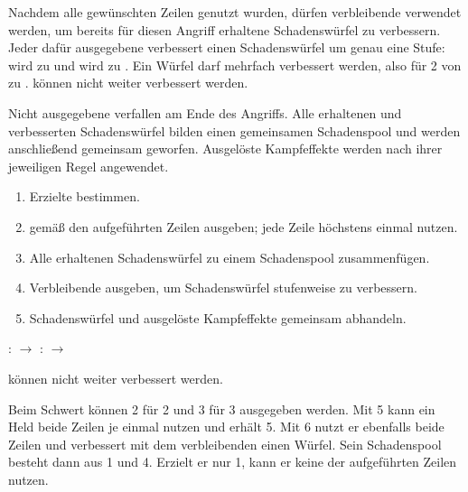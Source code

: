 Nachdem alle gewünschten Zeilen genutzt wurden, dürfen verbleibende \star{} verwendet werden, um bereits für diesen Angriff erhaltene Schadenswürfel zu verbessern. Jeder dafür ausgegebene \star{} verbessert einen Schadenswürfel um genau eine Stufe: \orangeDmgDie{} wird zu \redDmgDie{} und \redDmgDie{} wird zu \blackDmgDie{}. Ein Würfel darf mehrfach verbessert werden, also für 2\star{} von \orangeDmgDie{} zu \blackDmgDie{}. \blackDmgDie{} können nicht weiter verbessert werden.

Nicht ausgegebene \star{} verfallen am Ende des Angriffs. Alle erhaltenen und verbesserten Schadenswürfel bilden einen gemeinsamen Schadenspool und werden anschließend gemeinsam geworfen. Ausgelöste Kampfeffekte werden nach ihrer jeweiligen Regel angewendet.

\begin{kurzregel}[title=Sterne ausgeben]
\begin{enumerate}
  \item Erzielte \star{} bestimmen.
  \item \star{} gemäß den aufgeführten Zeilen ausgeben; jede Zeile höchstens einmal nutzen.
  \item Alle erhaltenen Schadenswürfel zu einem Schadenspool zusammenfügen.
  \item Verbleibende \star{} ausgeben, um Schadenswürfel stufenweise zu verbessern.
  \item Schadenswürfel und ausgelöste Kampfeffekte gemeinsam abhandeln.
\end{enumerate}
\end{kurzregel}

\begin{kurzregel}[title=Schadenswürfel verbessern]
\star{}: \orangeDmgDie{} $\rightarrow$ \redDmgDie{} \qquad
\star{}: \redDmgDie{} $\rightarrow$ \blackDmgDie{}

\blackDmgDie{} können nicht weiter verbessert werden.
\end{kurzregel}

\begin{beispiel}[title=Beispiel: Sterne beim Schwert ausgeben]
Beim Schwert können 2\star{} für 2\orangeDmgDie{} und 3\star{} für 3\orangeDmgDie{} ausgegeben werden. Mit 5\star{} kann ein Held beide Zeilen je einmal nutzen und erhält 5\orangeDmgDie{}. Mit 6\star{} nutzt er ebenfalls beide Zeilen und verbessert mit dem verbleibenden \star{} einen Würfel. Sein Schadenspool besteht dann aus 1\redDmgDie{} und 4\orangeDmgDie{}. Erzielt er nur 1\star{}, kann er keine der aufgeführten Zeilen nutzen.
\end{beispiel}

